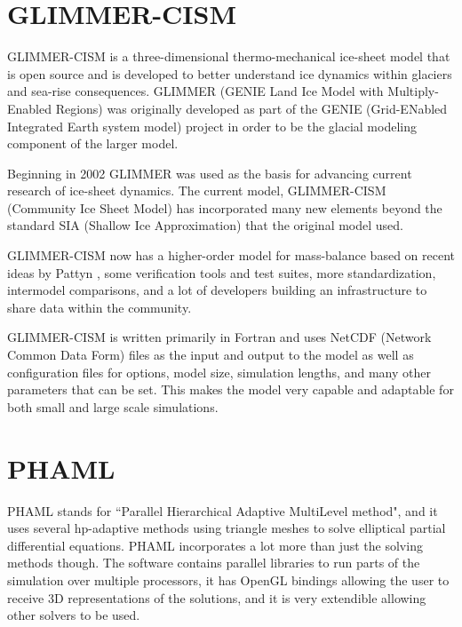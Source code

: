 \section{GLIMMER-CISM}\label{sec:chp2cism}

GLIMMER-CISM is a three-dimensional thermo-mechanical ice-sheet model that is open source and is developed to better understand ice dynamics within glaciers and sea-rise consequences.  GLIMMER (GENIE Land Ice Model with Multiply-Enabled Regions) was originally developed as part of the GENIE (Grid-ENabled Integrated Earth system model) project in order to be the glacial modeling component of the larger model.\citep{glimmerdoc}

Beginning in 2002 GLIMMER was used as the basis for advancing current research of ice-sheet dynamics.  The current model, GLIMMER-CISM (Community Ice Sheet Model) has incorporated many new elements beyond the standard SIA (Shallow Ice Approximation) that the original model used. 
\citep{cismwiki:website}

GLIMMER-CISM now has a higher-order model for mass-balance based on recent ideas by Pattyn \citep{Pattyn:2003}, some verification tools and test suites, more standardization, intermodel comparisons, and a lot of developers building an infrastructure to share data within the community.

GLIMMER-CISM is written primarily in Fortran and uses NetCDF (Network Common Data Form) files as the input and output to the model as well as configuration files for options, model size, simulation lengths, and many other parameters that can be set.  This makes the model very capable and adaptable for both small and large scale simulations. 



\section{PHAML}\label{sec:ch2phaml}

PHAML stands for ``Parallel Hierarchical Adaptive MultiLevel method", and it uses several hp-adaptive methods using triangle meshes to solve elliptical partial differential equations.  PHAML incorporates a lot more than just the solving methods though.  The software contains parallel libraries to run parts of the simulation over multiple processors, it has OpenGL bindings allowing the user to receive 3D representations of the solutions, and it is very extendible allowing other solvers to be used.

